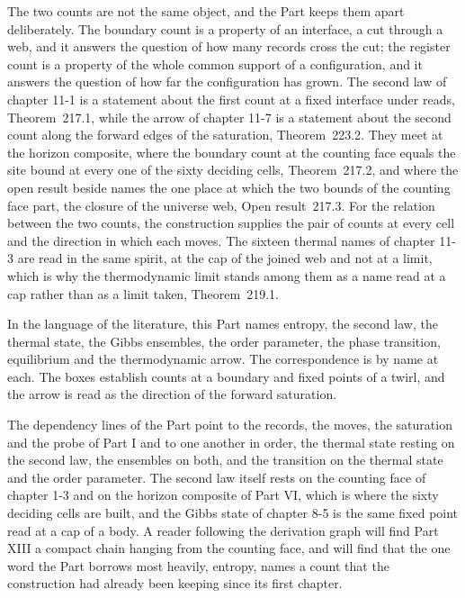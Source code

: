 The two counts are not the same object, and the Part keeps them apart deliberately. The boundary count is a property of an interface, a cut through a web, and it answers the question of how many records cross the cut; the register count is a property of the whole common support of a configuration, and it answers the question of how far the configuration has grown. The second law of chapter 11-1 is a statement about the first count at a fixed interface under reads, Theorem~217.1, while the arrow of chapter 11-7 is a statement about the second count along the forward edges of the saturation, Theorem~223.2. They meet at the horizon composite, where the boundary count at the counting face equals the site bound at every one of the sixty deciding cells, Theorem~217.2, and where the open result beside names the one place at which the two bounds of the counting face part, the closure of the universe web, Open result~217.3. For the relation between the two counts, the construction supplies the pair of counts at every cell and the direction in which each moves. The sixteen thermal names of chapter 11-3 are read in the same spirit, at the cap of the joined web and not at a limit, which is why the thermodynamic limit stands among them as a name read at a cap rather than as a limit taken, Theorem~219.1.

In the language of the literature, this Part names entropy, the second law, the thermal state, the Gibbs ensembles, the order parameter, the phase transition, equilibrium and the thermodynamic arrow. The correspondence is by name at each. The boxes establish counts at a boundary and fixed points of a twirl, and the arrow is read as the direction of the forward saturation.

The dependency lines of the Part point to the records, the moves, the saturation and the probe of Part I and to one another in order, the thermal state resting on the second law, the ensembles on both, and the transition on the thermal state and the order parameter. The second law itself rests on the counting face of chapter 1-3 and on the horizon composite of Part VI, which is where the sixty deciding cells are built, and the Gibbs state of chapter 8-5 is the same fixed point read at a cap of a body. A reader following the derivation graph will find Part XIII a compact chain hanging from the counting face, and will find that the one word the Part borrows most heavily, entropy, names a count that the construction had already been keeping since its first chapter.
